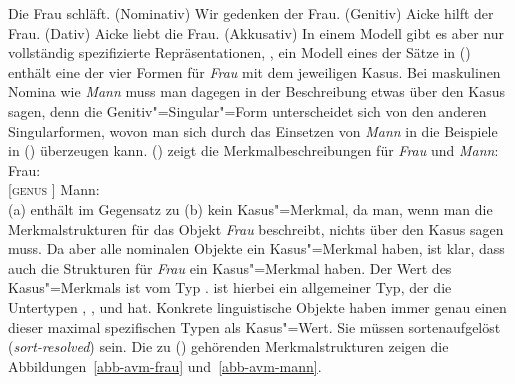 \eal\jamwidth=6cm\relax
\ex Die Frau schläft.       \jam(Nominativ)
\ex Wir gedenken der Frau.  \jam(Genitiv)
\ex Aicke hilft der Frau.      \jam(Dativ)
\ex Aicke liebt die Frau.      \jam(Akkusativ)
\zl
In einem Modell gibt es aber nur vollständig spezifizierte Repräsentationen,
\dash, ein Modell eines der Sätze in () enthält eine der vier Formen für \emph{Frau} mit dem jeweiligen Kasus.
Bei maskulinen Nomina wie \emph{Mann} muss man dagegen in der Beschreibung
etwas über den Kasus sagen, denn die Genitiv"=Singular"=Form unterscheidet
sich von den anderen Singularformen, wovon man sich durch das Einsetzen
von \emph{Mann} in die Beispiele in () überzeugen kann. () zeigt die
Merkmalbeschreibungen für \emph{Frau} und \emph{Mann}:
\eal
\ex\label{avm-frau}%
Frau:\\[-2pt]
{}[\textsc{genus} ]
\ex\label{avm-mann}%
Mann:\\
\zl
(a) enthält im Gegensatz zu (b) kein Kasus"=Merkmal, da man, wenn man die
Merkmalstrukturen für das Objekt \emph{Frau} beschreibt, nichts über den Kasus sagen muss. Da aber
alle nominalen Objekte ein Kasus"=Merkmal haben, ist klar, dass auch die Strukturen für \emph{Frau}
ein Kasus"=Merkmal haben. Der Wert des Kasus"=Merkmals ist vom Typ .
 ist hierbei ein allgemeiner Typ, der die Untertypen , ,
 und  hat. Konkrete linguistische Objekte haben immer genau einen dieser
maximal spezifischen Typen als Kasus"=Wert. Sie müssen sortenaufgelöst (\emph{sort-resolved}) sein. Die zu () gehörenden Merkmalstrukturen zeigen die
Abbildungen~\ref{abb-avm-frau} und~\ref{abb-avm-mann}.%

